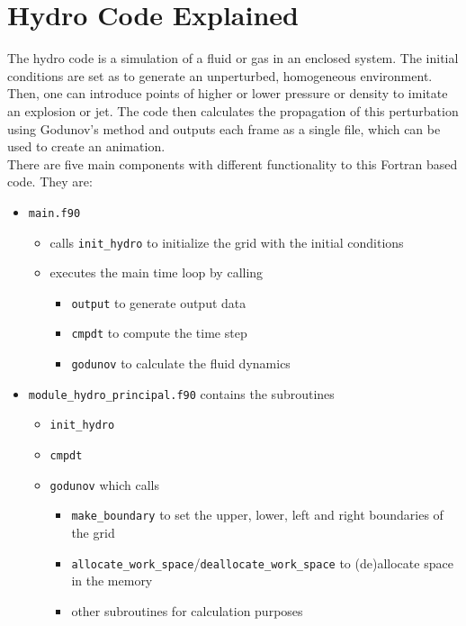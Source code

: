 \documentclass[12pt, a4paper, titlepage]{article}
\begin{document}
\newpage
\clearpage
\thispagestyle{plain}
\setcounter{page}{1}
{\pagestyle{plain}
\tableofcontents\label{toc}
\clearpage
{}
\setcounter{page}{1}




\newpage
\section{Hydro Code Explained}

The hydro code is a simulation of a fluid or gas in an enclosed system. The initial conditions are set as to generate an unperturbed, homogeneous environment. Then, one can introduce points of higher or lower pressure or density to imitate an explosion or jet. The code then calculates the propagation of this perturbation using Godunov's method and outputs each frame as a single file, which can be used to create an animation.\\

There are five main components with different functionality to this Fortran based code. They are:
\begin{itemize}
	\item \texttt{main.f90}
	\begin{itemize}
		\item calls \texttt{init\_hydro} to initialize the grid with the initial conditions
		\item executes the main time loop by calling
		\begin{itemize}
		\item \texttt{output} to generate output data
		\item \texttt{cmpdt} to compute the time step
		\item \texttt{godunov} to calculate the fluid dynamics
		\end{itemize}
	\end{itemize}
	\item \texttt{module\_hydro\_principal.f90} contains the subroutines
	\begin{itemize}
		\item \texttt{init\_hydro}
		\item \texttt{cmpdt}
		\item \texttt{godunov} which calls
		\begin{itemize}
				\item \texttt{make\_boundary} to set the upper, lower, left and right boundaries of the grid
				\item \texttt{allocate\_work\_space}/\texttt{deallocate\_work\_space} to (de)allocate space in the memory
				\item other subroutines for calculation purposes
			

\end{itemize}
\end{itemize}
\end{itemize}}
\end{document}
